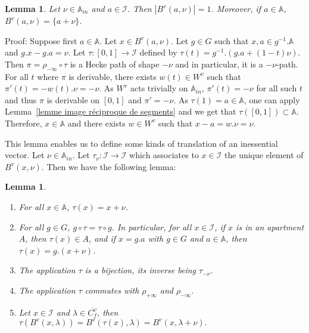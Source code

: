 \documentclass[12pt]{article}
\theoremstyle{plain}
\newtheorem{lemme}[thm]{Lemma}
\theoremstyle{definition}
\newcommand{\A}{\mathbb{A}}
\newcommand{\I}{\mathcal{I}}
\begin{document}
\begin{lemme}\label{lemme partie inessentielle}
 Let $\nu\in\A_{in}$ and $a\in \I$. Then $|B^v(a,\nu)|=1$. Moreover, if $a\in \A$, $B^v(a,\nu)=\{a+\nu\}$. 

\end{lemme} 

Proof: Suppose first $a\in\A$. Let $x\in B^v(a,\nu)$. Let $g\in G$ such that $x,a\in g^{-1}.\A$ and $g.x-g.a=\nu$. Let $\tau:[0,1]\rightarrow \I$ defined by $\tau(t)=g^{-1}.(g.a+(1-t)\nu)$. Then $\pi=\rho_{-\infty}\circ \tau$ is a Hecke path of shape $-\nu$ and in particular,  it is a $-\nu$-path. For all $t$ where $\pi$ is derivable, there exists $w(t)\in W^v$ such that $\pi'(t)=-w(t).\nu=-\nu$. As $W^v$ acts trivially on $\A_{in}$, $\pi'(t)=-\nu$ for all such $t$ and thus $\pi$ is derivable on $[0,1]$ and $\pi'=-\nu$. As $\tau(1)=a\in \A$, one can apply Lemma~\ref{lemme image réciproque de segments} and we get that $\tau([0,1])\subset \A$. Therefore, $x\in \A$ and there exists $w\in W^v$ such that $x-a=w.\nu=\nu$.

\vspace{3mm}

This lemma enables us to define some kinds of translation of an inessential vector. Let $\nu\in \A_{in}$. Let $\tau_\nu:\I\rightarrow \I$ which associates to $x\in \I$ the unique element of $B^v(x,\nu)$. Then we have the following lemma: 

\begin{lemme}\label{lemme propriétés des translations}
\begin{enumerate}
Let $\nu\in \A_{in}$ and $\tau=\tau_\nu$. Then:

\item For all $x\in \A$, $\tau(x)=x+\nu$.\label{item tau restreint à A}

\item For all $g\in G$, $g\circ\tau=\tau\circ g$. In particular, for all $x\in \I$, if $x$ is in an apartment $A$,
 then $\tau(x)\in A$, and if $x=g.a$ with $g\in G$ and $a\in\A$, then $\tau(x)=g.(x+\nu)$.\label{item commutation de tau}

\item The application $\tau$ is a bijection, its inverse being $\tau_{-\nu}$.\label{item bijectivité des translations}


\item The application $\tau$ commutes with $\rho_{+\infty}$ and $\rho_{-\infty}.$\label{item commutation translation retraction}

\item Let $x\in \I$ and $\lambda\in \overline{C_f^v}$, then $\tau(B^v(x,\lambda))=B^v(\tau(x),\lambda)=B^v(x,\lambda+\nu).$\label{item translation d'une boule}

\end{enumerate}
\end{lemme}
\end{document}
